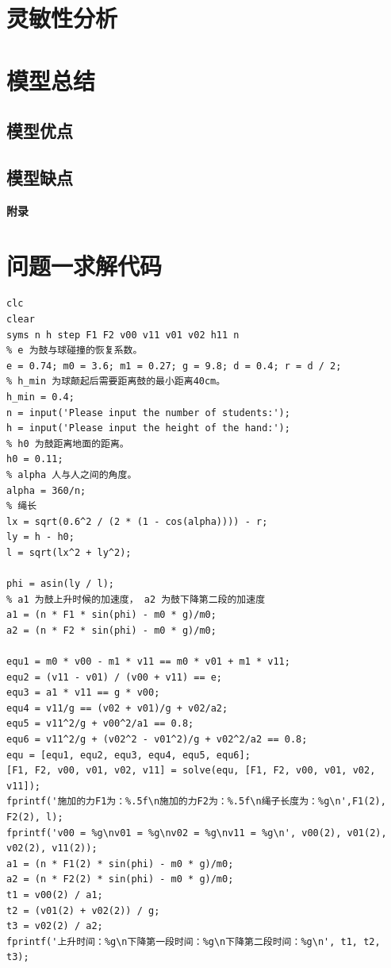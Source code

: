 \documentclass{cumcm}
\begin{document}
\section{灵敏性分析}

\section{模型总结}

\subsection{模型优点}

\subsection{模型缺点}




\begin{thebibliography}{99}
\end{thebibliography}

\newpage
\appendix
\textbf{附录}
\section{问题一求解代码}
\begin{lstlisting}
clc
clear
syms n h step F1 F2 v00 v11 v01 v02 h11 n
% e 为鼓与球碰撞的恢复系数。
e = 0.74; m0 = 3.6; m1 = 0.27; g = 9.8; d = 0.4; r = d / 2;
% h_min 为球颠起后需要距离鼓的最小距离40cm。
h_min = 0.4;
n = input('Please input the number of students:');
h = input('Please input the height of the hand:');
% h0 为鼓距离地面的距离。
h0 = 0.11;
% alpha 人与人之间的角度。
alpha = 360/n;
% 绳长
lx = sqrt(0.6^2 / (2 * (1 - cos(alpha)))) - r;
ly = h - h0;
l = sqrt(lx^2 + ly^2);

phi = asin(ly / l);
% a1 为鼓上升时候的加速度， a2 为鼓下降第二段的加速度
a1 = (n * F1 * sin(phi) - m0 * g)/m0;
a2 = (n * F2 * sin(phi) - m0 * g)/m0;

equ1 = m0 * v00 - m1 * v11 == m0 * v01 + m1 * v11;
equ2 = (v11 - v01) / (v00 + v11) == e;
equ3 = a1 * v11 == g * v00;
equ4 = v11/g == (v02 + v01)/g + v02/a2;
equ5 = v11^2/g + v00^2/a1 == 0.8;
equ6 = v11^2/g + (v02^2 - v01^2)/g + v02^2/a2 == 0.8;
equ = [equ1, equ2, equ3, equ4, equ5, equ6];
[F1, F2, v00, v01, v02, v11] = solve(equ, [F1, F2, v00, v01, v02, v11]);
fprintf('施加的力F1为：%.5f\n施加的力F2为：%.5f\n绳子长度为：%g\n',F1(2), F2(2), l);
fprintf('v00 = %g\nv01 = %g\nv02 = %g\nv11 = %g\n', v00(2), v01(2), v02(2), v11(2));
a1 = (n * F1(2) * sin(phi) - m0 * g)/m0;
a2 = (n * F2(2) * sin(phi) - m0 * g)/m0;
t1 = v00(2) / a1;
t2 = (v01(2) + v02(2)) / g;
t3 = v02(2) / a2;
fprintf('上升时间：%g\n下降第一段时间：%g\n下降第二段时间：%g\n', t1, t2, t3);

\end{lstlisting}
\end{document}
